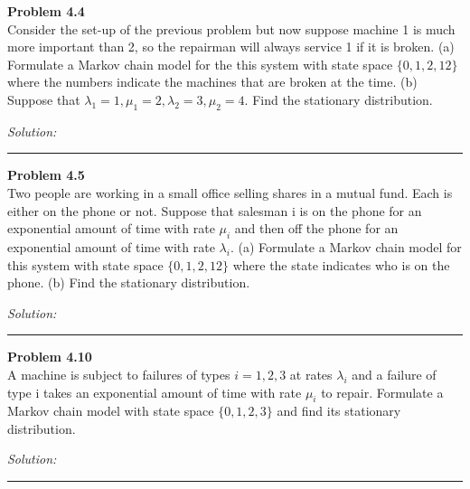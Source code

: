 \documentclass[a4paper, 11pt]{article}
\newenvironment{problem}[2][Problem]
    { \begin{mdframed}[backgroundcolor=gray!20] \textbf{#1 #2} \\}
    {  \end{mdframed}}
\newenvironment{solution}
    {\textit{Solution:}}
    {}
\begin{document}
\begin{problem}{4.4}
Consider the set-up of the previous problem but now suppose machine 1 is much more important than 2, so the repairman will always service 1 if it is broken. (a) Formulate a Markov chain model for the this system with state space $\{0, 1, 2, 12\}$ where the numbers indicate the machines that are broken at the time. (b) Suppose that $\lambda_1 = 1, \mu_1 = 2, \lambda_2 = 3, \mu_2 = 4$. Find the stationary distribution.
\end{problem}
\begin{solution}


\end{solution} 
%
\noindent\rule{7in}{2.8pt}

\begin{problem}{4.5}
Two people are working in a small office selling shares in a mutual fund. Each is either on the phone or not. Suppose that salesman i is on the phone for an exponential amount of time with rate $\mu_i$ and then off the phone for an exponential amount of time with rate $\lambda_i$. (a) Formulate a Markov chain model for this system with state space $\{0, 1, 2, 12\}$ where the state indicates who is on the phone. (b) Find the stationary distribution.
\end{problem}
\begin{solution}


\end{solution} 
%
\noindent\rule{7in}{2.8pt}

\begin{problem}{4.10}
A machine is subject to failures of types $i = 1, 2, 3$ at rates $\lambda_i$ and a failure of type i takes an exponential amount of time with rate $\mu_i$ to repair. Formulate a Markov chain model with state space $\{0, 1, 2, 3\}$ and find its stationary distribution.
\end{problem}
\begin{solution}


\end{solution} 
%
\noindent\rule{7in}{2.8pt}
\end{document}
